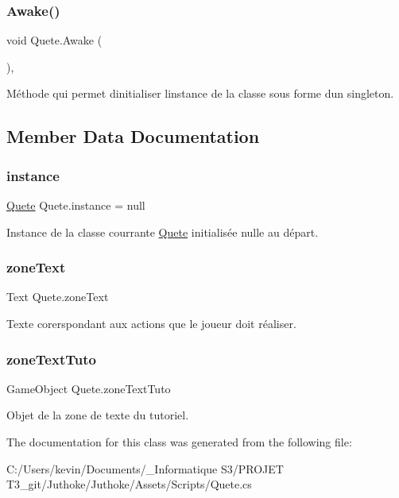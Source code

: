 \subsubsection{\texorpdfstring{Awake()}{Awake()}}
{\footnotesize\ttfamily void Quete.\+Awake (\begin{DoxyParamCaption}{ }\end{DoxyParamCaption})\hspace{0.3cm}{\ttfamily [inline]}, {\ttfamily [private]}}

Méthode qui permet d\textquotesingle{}initialiser l\textquotesingle{}instance de la classe sous forme d\textquotesingle{}un singleton. 

\subsection{Member Data Documentation}
\mbox{\label{class_quete_addf0701af1e0e04e11887c2626feb0ce}} 
\subsubsection{\texorpdfstring{instance}{instance}}
{\footnotesize\ttfamily \mbox{\hyperlink{class_quete}{Quete}} Quete.\+instance = null\hspace{0.3cm}{\ttfamily [static]}}

Instance de la classe courrante \mbox{\hyperlink{class_quete}{Quete}} initialisée nulle au départ. \mbox{\label{class_quete_aec767eb7fcca6ffd262bf7bdac0e0c82}} 
\subsubsection{\texorpdfstring{zone\+Text}{zoneText}}
{\footnotesize\ttfamily Text Quete.\+zone\+Text}

Texte corerspondant aux actions que le joueur doit réaliser. \mbox{\label{class_quete_adad53e5e4589ff56802d22053d12f0e6}} 
\subsubsection{\texorpdfstring{zone\+Text\+Tuto}{zoneTextTuto}}
{\footnotesize\ttfamily Game\+Object Quete.\+zone\+Text\+Tuto}

Objet de la zone de texte du tutoriel. 

The documentation for this class was generated from the following file\+:\begin{DoxyCompactItemize}
\item 
C\+:/\+Users/kevin/\+Documents/\+\_\+\+Informatique S3/\+P\+R\+O\+J\+E\+T T3\+\_\+git/\+Juthoke/\+Juthoke/\+Assets/\+Scripts/Quete.\+cs\end{DoxyCompactItemize}
